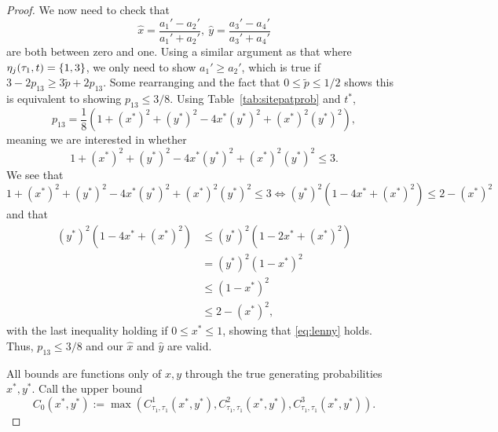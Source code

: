 \begin{proof}
We now need to check that
$$
\hat{x} = \frac{a_{1}'-a_{2}'}{a_{1}'+a_{2}'}, \ \hat{y} = \frac{a_{3}'-a_{4}'}{a_{3}'+a_{4}'}
$$
are both between zero and one.
Using a similar argument as that where $\eta_j(\tau_1, t) = \{1,3\}$, we only need to show $a_1' \ge a_2'$, which is true if $3-2p_{13} \ge 3\tilde{p}+2p_{13}$.
Some rearranging and the fact that $0 \le \tilde{p} \le 1/2$ shows this is equivalent to showing $p_{13} \le 3/8$.
Using Table~\ref{tab:sitepatprob} and $t^*$,
$$
p_{13} = \frac{1}{8}\left(1 + (x^*)^2 + (y^*)^2 - 4x^*(y^*)^2 + (x^*)^2(y^*)^2\right),
$$
meaning we are interested in whether
\begin{equation}
1 + (x^*)^2 + (y^*)^2 - 4x^*(y^*)^2 + (x^*)^2(y^*)^2 \le 3.
\label{eq:generating_ineq}
\end{equation}
We see that
\begin{equation}
1 + (x^*)^2 + (y^*)^2 - 4x^*(y^*)^2 + (x^*)^2(y^*)^2 \le 3 \iff (y^*)^2\left(1 - 4x^* + (x^*)^2\right) \le 2 - (x^*)^2
\label{eq:lenny}
\end{equation}
and that
\begin{align*}
(y^*)^2\left(1 - 4x^* + (x^*)^2\right) &\le (y^*)^2\left(1 - 2x^* + (x^*)^2\right) \\
                                       &=   (y^*)^2\left(1 - x^*\right)^2 \\
                                       &\le        \left(1 - x^*\right)^2 \\
                                       &\le              2 - (x^*)^2,
\end{align*}
with the last inequality holding if $0 \le x^* \le 1$, showing that \eqref{eq:lenny} holds.
Thus, $p_{13} \le 3/8$ and our $\hat{x}$ and $\hat{y}$ are valid.

All bounds are functions only of $x,y$ through the true generating probabilities $x^*, y^*$.
Call the upper bound
$$
C_0(x^*, y^*) := \max\left(C^{1}_{\tau_1,\tau_1}(x^*, y^*), C^{2}_{\tau_1,\tau_1}(x^*, y^*), C^{3}_{\tau_1,\tau_1}(x^*, y^*)\right).
$$


\end{proof}
